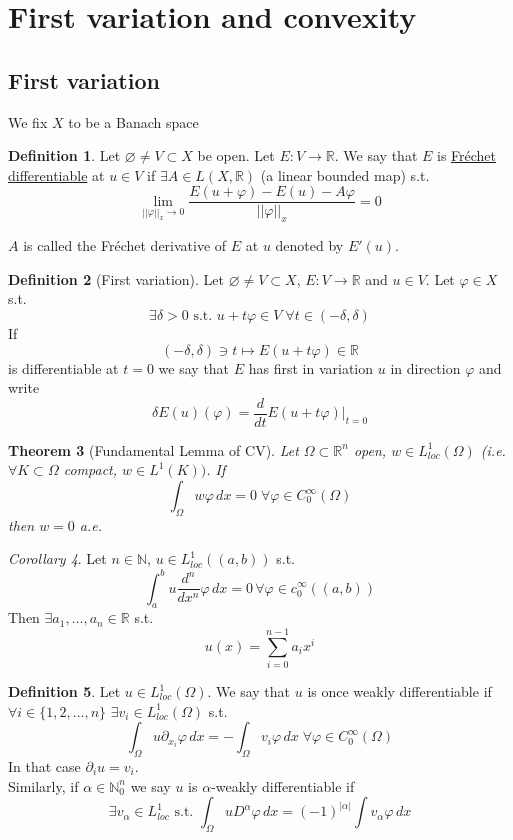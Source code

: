 \documentclass[a4paper, 12pt]{article}
\theoremstyle{plain}
\newtheorem{theorem}{Theorem}[section] %
\theoremstyle{definition}
\newtheorem{definition}[theorem]{Definition} %
\theoremstyle{lemma}
\theoremstyle{remark}
\theoremstyle{corollary}
\newtheorem{corollary}[theorem]{Corollary}
\theoremstyle{example}
\begin{document}
	\section{First variation and convexity}
	\subsection{First variation}
	We fix $X$ to be a Banach space
	\begin{definition}
		Let $\varnothing \neq V\subset X$ be open. Let $E: V \to \mathbb{R}$. We say that $E$ is \underline{Fréchet differentiable} at $u \in V$ if $\exists A \in L(X,\mathbb{R})$ (a linear bounded map) s.t. \[\lim_{||\varphi||_x \to 0} \frac{E(u + \varphi) - E(u) - A\varphi}{||\varphi||_x} = 0\]
	\end{definition}
	$A$ is called the Fréchet derivative of $E$ at $u$ denoted by $E'(u)$.
	\begin{definition}[First variation]
		Let $\varnothing \neq V \subset X$, $E:V \to \mathbb{R}$ and $u \in V$. Let $\varphi \in X$ s.t. \[\exists \delta > 0 \text{ s.t. } u + t\varphi \in V \; \forall t \in (-\delta, \delta)\]
		If \[(-\delta, \delta) \ni t \mapsto E(u+t\varphi) \in \mathbb{R}\] is differentiable at $t=0$ we say that $E$ has first in variation $u$ in direction $\varphi$ and write \[\delta E(u)(\varphi) = \frac{d}{dt} E(u+t\varphi)|_{t = 0}\]
	\end{definition}
	\begin{theorem}[Fundamental Lemma of CV]
		Let $\Omega \subset \mathbb{R}^n$ open, $w \in L_{loc}^1(\Omega)$ (i.e. $\forall K \subset \Omega$ compact, $w \in L^1(K))$. If \[\int_\Omega w\varphi \,dx = 0 \; \forall \varphi \in C_0^\infty(\Omega)\] then $w = 0$ a.e.
	\end{theorem}
	\begin{corollary}
		Let $n \in \mathbb{N}$, $u \in L^1_{loc}((a,b))$ s.t. \[\int_a^b u \frac{d^n}{dx^n} \varphi \,dx = 0 \,\forall \varphi \in c_0^\infty ((a,b))\] Then $\exists a_1,...,a_n \in \mathbb{R}$ s.t. \[u(x) = \sum_{i=0}^{n-1} a_i x^i\]
	\end{corollary}
	\begin{definition}
		Let $u \in L^1_{loc}(\Omega)$. We say that $u$ is once weakly differentiable if $\forall i \in \{1,2,...,n\}$ $\exists v_i \in L^1_{loc}(\Omega)$ s.t. \[\int_\Omega u \partial_{x_i}\varphi \, dx = - \int_\Omega v_i \varphi \,dx \; \forall \varphi \in C_0^\infty (\Omega)\] In that case $\partial_i u = v_i$.\\
		Similarly, if $\alpha \in \mathbb{N}_0^n$ we say $u$ is $\alpha$-weakly differentiable if \[\exists v_\alpha \in L^1_{loc} \text{ s.t. } \int_\Omega uD^\alpha \varphi \, dx = (-1)^{\left|\alpha\right|} \int v_\alpha \varphi \, dx\]
	\end{definition}
\end{document}

